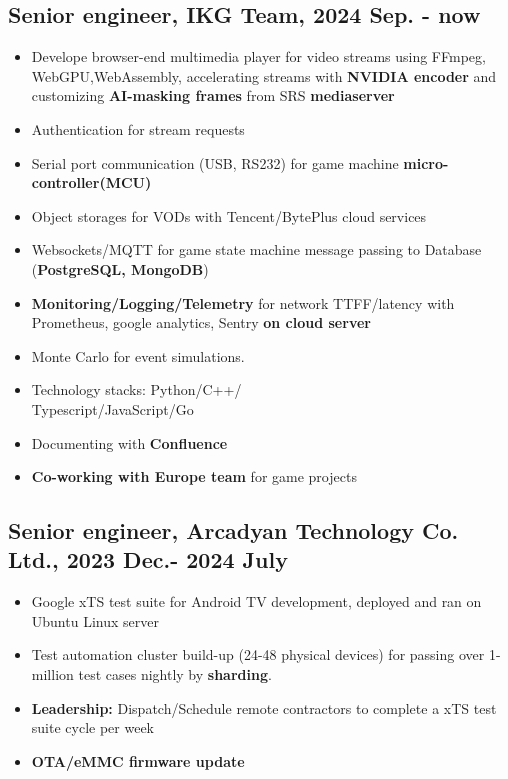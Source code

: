 \documentclass[11pt]{article}
\begin{document}
\begin{multicols*}{2}
\subsection*{Senior engineer, IKG Team, 2024 Sep. - now}
\begin{itemize}[noitemsep]
    \item Develope browser-end multimedia player for video streams using FFmpeg, WebGPU,WebAssembly, accelerating streams with \textbf{NVIDIA encoder} and customizing\textbf{ AI-masking frames} from SRS\textbf{ mediaserver} 
    \item Authentication for stream requests
    \item Serial port communication (USB, RS232) for game machine \textbf{micro-controller(MCU)}
    \item Object storages for VODs with Tencent/BytePlus cloud services
    \item Websockets/MQTT for game state machine message passing to Database (\textbf{PostgreSQL, MongoDB})
    \item \textbf{Monitoring/Logging/Telemetry} for network TTFF/latency with Prometheus, google analytics, Sentry \textbf{on cloud server}
    \item Monte Carlo for event simulations.
    \item Technology stacks: Python/C++/\\Typescript/JavaScript/Go 
    \item Documenting with \textbf{Confluence}
    \item \textbf{Co-working with Europe team} for game projects
\end{itemize}

\vspace{2em}

\subsection*{Senior engineer, Arcadyan Technology Co. Ltd., 2023 Dec.- 2024 July }
\begin{itemize}[noitemsep]
    \item Google xTS test suite for Android TV development, deployed and ran on Ubuntu Linux server
    \item Test automation cluster build-up (24-48 physical devices) for passing over 1-million test cases nightly by \textbf{sharding}.
    \item \textbf{Leadership:} Dispatch/Schedule remote contractors to complete a xTS test suite cycle per week
    \item \textbf{OTA/eMMC firmware update}
\end{itemize}


\end{multicols*}
\end{document}
